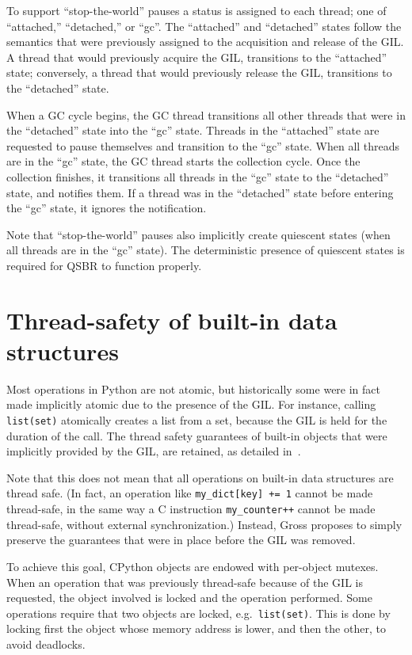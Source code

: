 To support ``stop-the-world'' pauses a status is assigned to each thread; one of ``attached,'' ``detached,'' or ``gc''.
The ``attached'' and ``detached'' states follow the semantics that were previously assigned to the acquisition and release of the GIL\@.
A thread that would previously acquire the GIL, transitions to the ``attached'' state; conversely, a thread that would previously release the GIL, transitions to the ``detached'' state.

When a GC cycle begins, the GC thread transitions all other threads that were in the ``detached'' state into the ``gc'' state.
Threads in the ``attached'' state are requested to pause themselves and transition to the ``gc'' state.
When all threads are in the ``gc'' state, the GC thread starts the collection cycle.
Once the collection finishes, it transitions all threads in the ``gc'' state to the ``detached'' state, and notifies them.
If a thread was in the ``detached'' state before entering the ``gc'' state, it ignores the notification.

Note that ``stop-the-world'' pauses also implicitly create quiescent states (when all threads are in the ``gc'' state).
The deterministic presence of quiescent states is required for QSBR to function properly.


\section{Thread-safety of built-in data structures}\label{sec:thread-safety-of-builtin-data-structures}

Most operations in Python are not atomic, but historically some were in fact made implicitly atomic due to the presence of the GIL\@.
For instance, calling \texttt{{list(set)}} atomically creates a list from a set, because the GIL is held for the duration of the call.
The thread safety guarantees of built-in objects that were implicitly provided by the GIL, are retained, as detailed in~\cite[\S Container Thread-Safety]{pep703}.

Note that this does not mean that all operations on built-in data structures are thread safe.
(In fact, an operation like \texttt{{my\_dict[key] += 1}} cannot be made thread-safe, in the same way a C instruction \texttt{{my\_counter++}} cannot be made thread-safe, without external synchronization.)
Instead, Gross proposes to simply preserve the guarantees that were in place before the GIL was removed.

To achieve this goal, CPython objects are endowed with per-object mutexes.
When an operation that was previously thread-safe because of the GIL is requested, the object involved is locked and the operation performed.
Some operations require that two objects are locked, e.g.\ \texttt{{list(set)}}.
This is done by locking first the object whose memory address is lower, and then the other, to avoid deadlocks.

